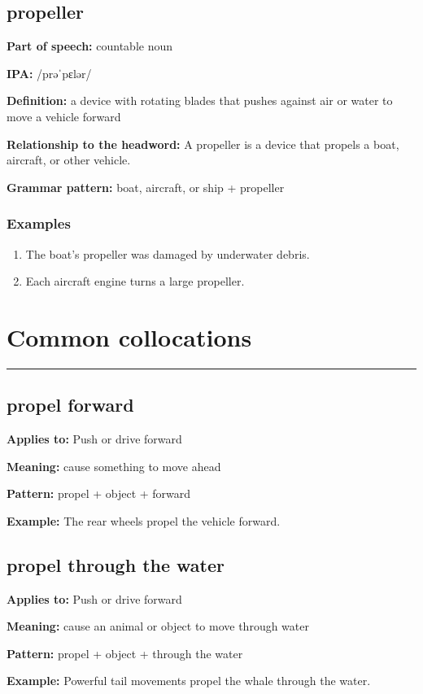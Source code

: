 \documentclass[11pt]{article}
\newcommand{\sectionrule}{\par\vspace{-0.5em}\noindent\textcolor{Accent}{\rule{\linewidth}{0.6pt}}\par}
\begin{document}
\subsection{propeller}
\textbf{Part of speech:} countable noun

\textbf{IPA:} /prəˈpɛlər/

\textbf{Definition:} a device with rotating blades that pushes against air or water to move a vehicle forward

\textbf{Relationship to the headword:} A propeller is a device that propels a boat, aircraft, or other vehicle.

\textbf{Grammar pattern:} boat, aircraft, or ship + propeller

\subsubsection{Examples}
\begin{enumerate}
  \item The boat's propeller was damaged by underwater debris.
  \item Each aircraft engine turns a large propeller.
\end{enumerate}

\section{Common collocations}
\sectionrule
\subsection{propel forward}
\textbf{Applies to:} Push or drive forward

\textbf{Meaning:} cause something to move ahead

\textbf{Pattern:} propel + object + forward

\textbf{Example:} The rear wheels propel the vehicle forward.

\subsection{propel through the water}
\textbf{Applies to:} Push or drive forward

\textbf{Meaning:} cause an animal or object to move through water

\textbf{Pattern:} propel + object + through the water

\textbf{Example:} Powerful tail movements propel the whale through the water.
\end{document}
